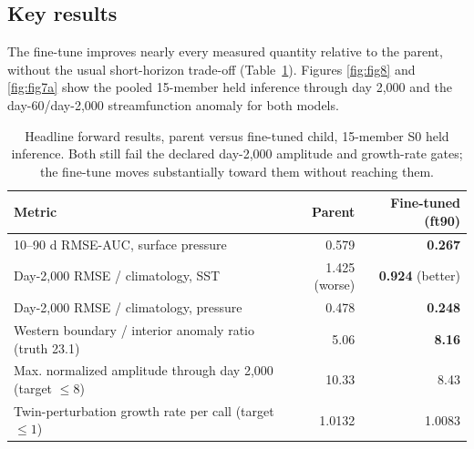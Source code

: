 \documentclass[3p,12pt]{elsarticle}
\begin{document}
\subsection{Key results}

The fine-tune improves nearly every measured quantity relative to the parent,
without the usual short-horizon trade-off (Table~\ref{tab:results}). Figures
\ref{fig:fig8} and \ref{fig:fig7a} show the pooled 15-member held inference
through day 2{,}000 and the day-60/day-2{,}000 streamfunction anomaly for both
models.

\begin{table}[H]
\centering
\small
\begin{tabular}{lrr}
\toprule
Metric & Parent & Fine-tuned (ft90) \\
\midrule
10--90 d RMSE-AUC, surface pressure & 0.579 & \textbf{0.267} \\
Day-2{,}000 RMSE / climatology, SST & 1.425 (worse) & \textbf{0.924} (better) \\
Day-2{,}000 RMSE / climatology, pressure & 0.478 & \textbf{0.248} \\
Western boundary / interior anomaly ratio (truth 23.1) & 5.06 & \textbf{8.16} \\
Max. normalized amplitude through day 2{,}000 (target $\le8$) & 10.33 & 8.43 \\
Twin-perturbation growth rate per call (target $\le1$) & 1.0132 & 1.0083 \\
\bottomrule
\end{tabular}
\caption{Headline forward results, parent versus fine-tuned child, 15-member S0
held inference. Both still fail the declared day-2{,}000 amplitude and growth-rate
gates; the fine-tune moves substantially toward them without reaching them.}
\label{tab:results}
\end{table}
\end{document}
